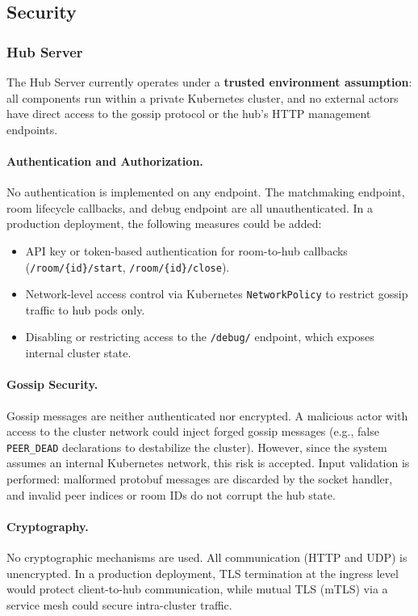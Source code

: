 \subsection{Security}\label{security}

\subsubsection{Hub Server}

The Hub Server currently operates under a \textbf{trusted environment assumption}: all components run within a private Kubernetes cluster, and no external actors have direct access to the gossip protocol or the hub's HTTP management endpoints.

\paragraph{Authentication and Authorization.}
No authentication is implemented on any endpoint.
The matchmaking endpoint, room lifecycle callbacks, and debug endpoint are all unauthenticated.
In a production deployment, the following measures could be added:
\begin{itemize}
  \item API key or token-based authentication for room-to-hub callbacks (\texttt{/room/\{id\}/start}, \texttt{/room/\{id\}/close}).
  \item Network-level access control via Kubernetes \texttt{NetworkPolicy} to restrict gossip traffic to hub pods only.
  \item Disabling or restricting access to the \texttt{/debug/} endpoint, which exposes internal cluster state.
\end{itemize}

\paragraph{Gossip Security.}
Gossip messages are neither authenticated nor encrypted.
A malicious actor with access to the cluster network could inject forged gossip messages (e.g., false \texttt{PEER\_DEAD} declarations to destabilize the cluster).
However, since the system assumes an internal Kubernetes network, this risk is accepted.
Input validation is performed: malformed protobuf messages are discarded by the socket handler, and invalid peer indices or room IDs do not corrupt the hub state.

\paragraph{Cryptography.}
No cryptographic mechanisms are used.
All communication (HTTP and UDP) is unencrypted.
In a production deployment, TLS termination at the ingress level would protect client-to-hub communication, while mutual TLS (mTLS) via a service mesh could secure intra-cluster traffic.

